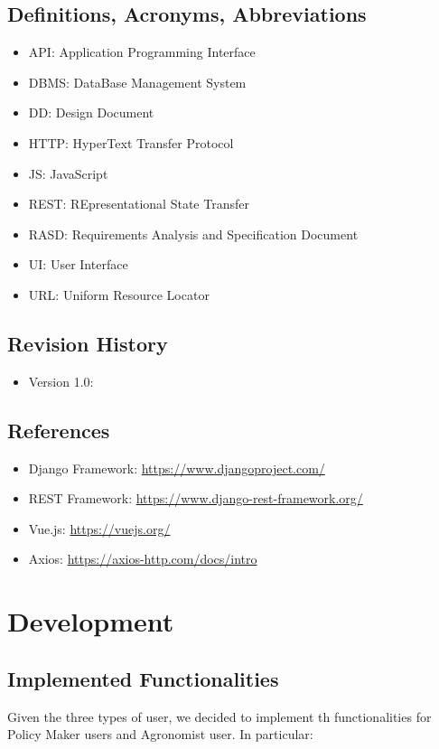 \documentclass[table, 12pt]{article}
\begin{document}
\subsection{Definitions, Acronyms, Abbreviations}
\begin{itemize}
    \item API: Application Programming Interface
    \item DBMS: DataBase Management System
    \item DD: Design Document
    \item HTTP: HyperText Transfer Protocol
    \item JS: JavaScript
    \item REST: REpresentational State Transfer
    \item RASD: Requirements Analysis and Specification Document
    \item UI: User Interface
    \item URL: Uniform Resource Locator
\end{itemize}
\subsection{Revision History}
\begin{itemize}
    \item Version 1.0:
\end{itemize}
\subsection{References}
\begin{itemize}
    \item Django Framework: \url{https://www.djangoproject.com/}
    \item REST Framework: \url{https://www.django-rest-framework.org/}
    \item Vue.js: \url{https://vuejs.org/}
    \item Axios: \url{https://axios-http.com/docs/intro}
\end{itemize}


\section{Development}
\subsection{Implemented Functionalities}
Given the three types of user, we decided to implement th functionalities for Policy Maker users and Agronomist user. In particular:
\end{document}
